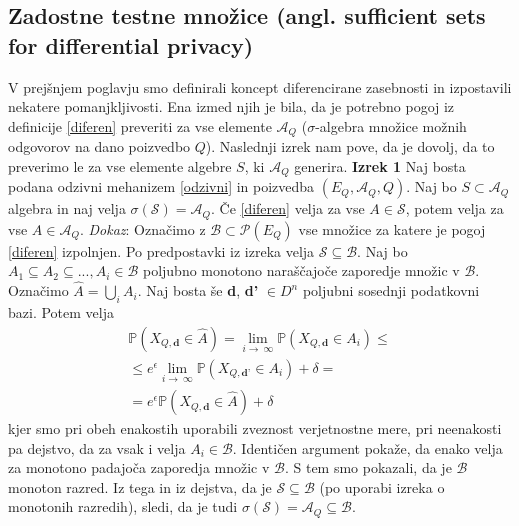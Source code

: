 \documentclass[mat1]{article}
\theoremstyle{definition}
\begin{document}
\subsection{Zadostne testne množice (angl. sufficient sets for differential privacy)}
V prejšnjem poglavju smo definirali koncept diferencirane zasebnosti in izpostavili nekatere pomanjkljivosti. Ena izmed njih je bila, da je potrebno pogoj iz definicije \eqref{diferen} preveriti za vse elemente $\mathcal{A}_Q$ ($\sigma$-algebra množice možnih odgovorov na dano poizvedbo $Q$). Naslednji izrek nam pove, da je dovolj, da to preverimo le za vse elemente algebre $S$, ki $\mathcal{A}_Q$ generira.
\newline
\newline
\textbf{Izrek 1} Naj bosta podana odzivni mehanizem \eqref{odzivni} in poizvedba $(E_Q, \mathcal{A}_Q, Q)$. Naj bo $S \subset \mathcal{A}_Q$ algebra in naj velja $\sigma(\mathcal{S}) = \mathcal{A}_Q$. Če \eqref{diferen} velja za vse $A \in \mathcal{S}$, potem velja za vse $A \in \mathcal{A}_Q$. 
\newline
\newline
\textit{Dokaz}: Označimo z $\mathcal{B} \subset \mathcal{P}(E_Q) $ vse množice za katere je pogoj \eqref{diferen} izpolnjen. Po predpostavki iz izreka velja $\mathcal{S} \subseteq \mathcal{B}$. Naj bo $A_1 \subseteq A_2 \subseteq ... , A_i \in \mathcal{B}$  poljubno monotono naraščajoče zaporedje množic v $\mathcal{B}$. Označimo $\hat{A} = \bigcup_{i} A_i$. Naj bosta še \textbf{d}, \textbf{d'} $\in D^n$ poljubni sosednji podatkovni bazi. Potem velja 
\begin{equation*}
\begin{split}
\mathbb{P}(X_{Q,\textbf{d}} \in \hat{A}) = \lim_{i \to\ \infty} \mathbb{P}(X_{Q,\textbf{d}} \in A_i)  \leq \\
\leq  e^\epsilon\lim_{i \to\ \infty} \mathbb{P}(X_{Q,\textbf{d'}} \in A_i) + \delta = \\
=  e^\epsilon \mathbb{P}(X_{Q,\textbf{d}} \in \hat{A}) + \delta
\end{split}
\end{equation*}
kjer smo pri obeh enakostih uporabili zveznost verjetnostne mere, pri neenakosti pa dejstvo, da za vsak i velja $A_i \in \mathcal{B}$. Identičen argument pokaže, da enako velja za monotono padajoča zaporedja množic v $\mathcal{B}$. S tem smo pokazali, da je $\mathcal{B}$ monoton razred. Iz tega in iz dejstva, da je $\mathcal{S} \subseteq \mathcal{B}$ (po uporabi izreka o monotonih razredih), sledi, da je tudi $\sigma(\mathcal{S}) = \mathcal{A}_Q \subseteq \mathcal{B}$.
\end{document}
